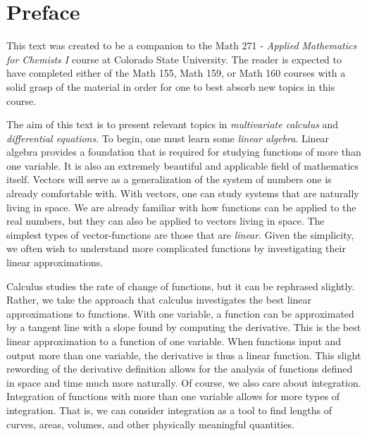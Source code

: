 \section*{Preface}

This text was created to be a companion to the Math 271 - \emph{Applied Mathematics for Chemists I} course at Colorado State University.  The reader is expected to have completed either of the Math 155, Math 159, or Math 160 courses with a solid grasp of the material in order for one to best absorb new topics in this course.

The aim of this text is to present relevant topics in \emph{multivariate calculus} and \emph{differential equations}.  To begin, one must learn some \emph{linear algebra}. Linear algebra provides a foundation that is required for studying functions of more than one variable.  It is also an extremely beautiful and applicable field of mathematics itself.  Vectors will serve as a generalization of the system of numbers one is already comfortable with.  With vectors, one can study systems that are naturally living in space.  We are already familiar with how functions can be applied to the real numbers, but they can also be applied to vectors living in space.  The simplest types of vector-functions are those that are \emph{linear}.  Given the simplicity, we often wish to understand more complicated functions by investigating their linear approximations.

Calculus studies the rate of change of functions, but it can be rephrased slightly.  Rather, we take the approach that calculus investigates the best linear approximations to functions.  With one variable, a function can be approximated by a tangent line with a slope found by computing the derivative. This is the best linear approximation to a function of one variable.  When functions input and output more than one variable, the derivative is thus a linear function. This slight rewording of the derivative definition allows for the analysis of functions defined in space and time much more naturally.  Of course, we also care about integration. Integration of functions with more than one variable allows for more types of integration.  That is, we can consider integration as a tool to find lengths of curves, areas, volumes, and other physically meaningful quantities.  

